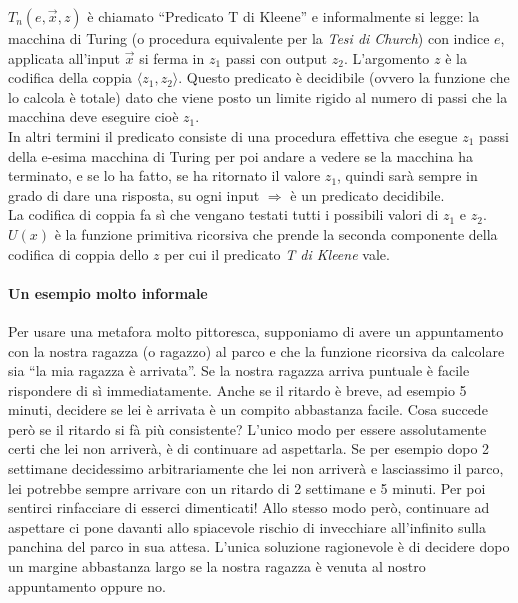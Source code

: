 $T_{n} \left( e,\overrightarrow{x},z \right)$ \`e chiamato "`Predicato T di Kleene"' e informalmente si legge: la macchina di Turing (o procedura equivalente per la \textit{Tesi di Church}) con indice $e$, applicata all'input $\overrightarrow{x}$ si ferma in $z_{1}$ passi con output $z_{2}$. L'argomento $z$ \`e la codifica della coppia $\langle  z_{1} , z_{2} \rangle$. Questo predicato \`e decidibile (ovvero la funzione che lo calcola \`e totale) dato che viene posto un limite rigido al numero di passi che la macchina deve eseguire cio\`{e} $z_1$.\\
In altri termini il predicato consiste di una procedura effettiva che esegue $z_1$ passi della e-esima macchina di Turing per poi andare a vedere se la macchina ha terminato, e se lo ha fatto, se ha ritornato il valore $z_1$, quindi sar\`{a} sempre in grado di dare una risposta, su ogni input $\Rightarrow$ \`{e} un predicato decidibile.\\
La codifica di coppia fa s\`i che vengano testati tutti i possibili valori di $z_1$ e $z_2$.\\
$U(x)$ \`{e} la funzione primitiva ricorsiva che prende la seconda componente della codifica di coppia dello $z$ per cui il predicato \textit{T di Kleene} vale.

\paragraph{\textbf{Un esempio molto informale}}

Per usare una metafora molto pittoresca, supponiamo di avere un appuntamento con la nostra ragazza (o ragazzo) al parco e che la funzione ricorsiva da calcolare sia "`la mia ragazza \`e arrivata"'. Se la nostra ragazza arriva puntuale \`e facile rispondere di s\`i immediatamente. Anche se il ritardo \`e breve, ad esempio 5 minuti, decidere se lei \`e arrivata \`e un compito abbastanza facile. Cosa succede per\`o se il ritardo si f\`a pi\`u consistente? L'unico modo per essere assolutamente certi che lei non arriver\`a, \`e di continuare ad aspettarla. Se per esempio dopo 2 settimane decidessimo arbitrariamente che lei non arriver\`a e lasciassimo il parco, lei potrebbe sempre arrivare con un ritardo di 2 settimane e 5 minuti. Per poi sentirci rinfacciare di esserci dimenticati! Allo stesso modo per\`o, continuare ad aspettare ci pone davanti allo spiacevole rischio di invecchiare all'infinito sulla panchina del parco in sua attesa. L'unica soluzione ragionevole \`e di decidere dopo un margine abbastanza largo se la nostra ragazza \`e venuta al nostro appuntamento oppure no.

